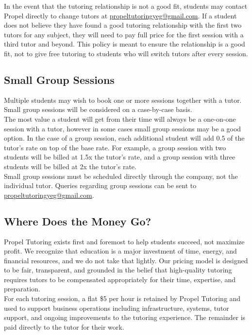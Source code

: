 \documentclass{article}
\begin{document}
In the event that the tutoring relationship is not a good fit, students may contact Propel directly to change tutors at \href{mailto:propeltutoringyeg@gmail.com}{propeltutoringyeg@gmail.com}. If a student does not believe they have found a good tutoring relationship with the first two tutors for any subject, they will need to pay full price for the first session with a third tutor and beyond. This policy is meant to ensure the relationship is a good fit, not to give free tutoring to students who will switch tutors after every session.

\subsection{Small Group Sessions}
Multiple students may wish to book one or more sessions together with a tutor. Small group sessions will be considered on a case-by-case basis.\\

The most value a student will get from their time will always be a one-on-one session with a tutor, however in some cases small group sessions may be a good option. In the case of a group session, each additional student will add 0.5 of the tutor's rate on top of the base rate. For example, a group session with two students will be billed at 1.5x the tutor's rate, and a group session with three students will be billed at 2x the tutor's rate.\\

Small group sessions must be scheduled directly through the company, not the individual tutor. Queries regarding group sessions can be sent to \href{mailto:propeltutoringyeg@gmail.com}{propeltutoringyeg@gmail.com}.

\subsection{Where Does the Money Go?}
Propel Tutoring exists first and foremost to help students succeed, not maximize profit. We recognize that education is a major investment of time, energy, and financial resources, and we do not take that lightly. Our pricing model is designed to be fair, transparent, and grounded in the belief that high-quality tutoring requires tutors to be compensated appropriately for their time, expertise, and preparation.\\

For each tutoring session, a flat \$5 per hour is retained by Propel Tutoring and used to support business operations including infrastructure, systems, tutor support, and ongoing improvements to the tutoring experience. The remainder is paid directly to the tutor for their work.
\end{document}
